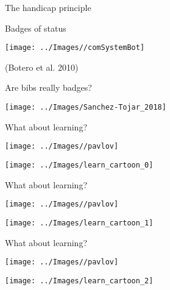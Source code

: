 \documentclass[
  ignorenonframetext,
]{beamer}
\begin{document}
\begin{frame}{The handicap principle}
\protect\hypertarget{the-handicap-principle-1}{}

\begin{block}{Badges of status}

\begin{center}\texttt{[image: ../Images//comSystemBot]} \end{center}

(Botero et al. 2010)

\end{block}

\end{frame}

\begin{frame}{Are bibs really badges?}
\protect\hypertarget{are-bibs-really-badges}{}

\begin{flushleft}\texttt{[image: ../Images/Sanchez-Tojar\_2018]} \end{flushleft}

\end{frame}

\begin{frame}{What about learning?}
\protect\hypertarget{what-about-learning}{}

\begin{center}\texttt{[image: ../Images//pavlov]} \end{center}

\begin{center}\texttt{[image: ../Images/learn\_cartoon\_0]} \end{center}

\end{frame}

\begin{frame}{What about learning?}
\protect\hypertarget{what-about-learning-1}{}

\begin{center}\texttt{[image: ../Images//pavlov]} \end{center}

\begin{center}\texttt{[image: ../Images/learn\_cartoon\_1]} \end{center}

\end{frame}

\begin{frame}{What about learning?}
\protect\hypertarget{what-about-learning-2}{}

\begin{center}\texttt{[image: ../Images//pavlov]} \end{center}

\begin{center}\texttt{[image: ../Images/learn\_cartoon\_2]} \end{center}

\end{frame}
\end{document}
